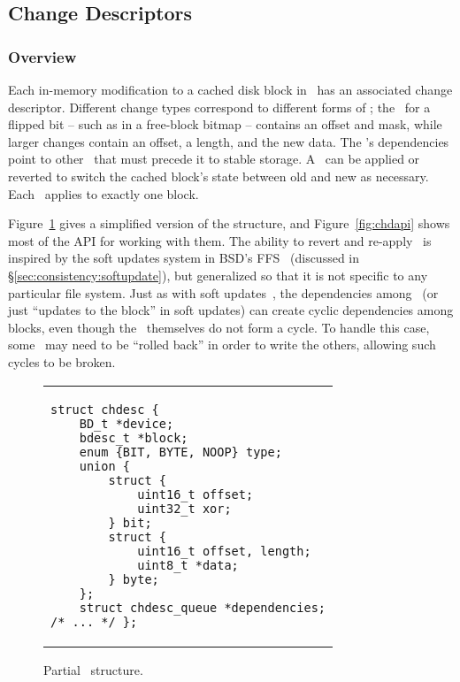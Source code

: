 \subsection {Change Descriptors}
\label{sec:design:chdescs}

\subsubsection {Overview}
Each in-memory modification to a cached disk block in \Kudos\ has an associated
change descriptor. Different change types correspond to different forms of
\chdescs; the \chdesc\ for a flipped bit -- such as in a free-block bitmap --
contains an offset and mask, while larger changes contain an offset, a length,
and the new data. The \chdesc's dependencies point to other \chdescs\ that must
precede it to stable storage. A \chdesc\ can be applied or reverted to switch
the cached block's state between old and new as necessary. Each \chdesc\ applies
to exactly one block.

Figure~\ref{fig:chdesc} gives a simplified version of the structure, and
Figure~\ref{fig:chdapi} shows most of the API for working with them. The ability
to revert and re-apply \chdescs\ is inspired by the soft updates system in BSD's
FFS~\cite{ganger00soft} (discussed in \S\ref{sec:consistency:softupdate}), but
generalized so that it is not specific to any particular file system. Just as
with soft updates~\cite{ganger00soft}, the dependencies among \chdescs\ (or just
``updates to the block'' in soft updates) can create cyclic dependencies among
blocks, even though the \chdescs\ themselves do not form a cycle. To handle this
case, some \chdescs\ may need to be ``rolled back'' in order to write the
others, allowing such cycles to be broken.

\begin{figure}
\vskip-14pt
\begin{tabular}{@{\hskip0.58in}p{2in}@{}}
\begin{scriptsize}
\begin{verbatim}
struct chdesc {
    BD_t *device;
    bdesc_t *block;
    enum {BIT, BYTE, NOOP} type;
    union {
        struct {
            uint16_t offset;
            uint32_t xor;
        } bit;
        struct {
            uint16_t offset, length;
            uint8_t *data;
        } byte;
    };
    struct chdesc_queue *dependencies;
/* ... */ };
\end{verbatim}
\end{scriptsize}
\end{tabular}
\vspace{-10pt}
\caption{\label{fig:chdesc} Partial \chdesc\ structure.}
\end{figure}


